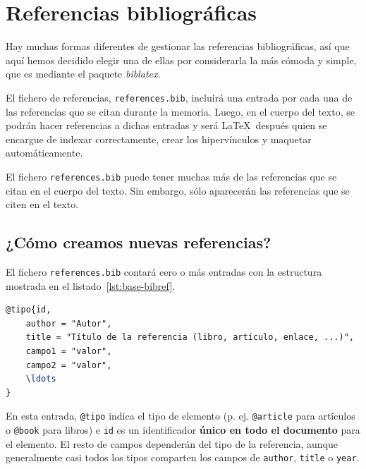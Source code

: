 \section{Referencias bibliográficas}
\label{s:referencias-bibliograficas}

Hay muchas formas diferentes de gestionar las referencias bibliográficas, así que aquí hemos decidido elegir una de ellas por considerarla la más cómoda y simple, que es mediante el paquete \textit{biblatex}.

El fichero de referencias, \texttt{references.bib}, incluirá una entrada por cada una de las referencias que se citan durante la memoria. Luego, en el cuerpo del texto, se podrán hacer referencias a dichas entradas y será \LaTeX~después quien se encargue de indexar correctamente, crear los hipervínculos y maquetar automáticamente.

El fichero \texttt{references.bib} puede tener muchas más de las referencias que se citan en el cuerpo del texto. Sin embargo, sólo aparecerán las referencias que se citen en el texto.

 
\subsection{¿Cómo creamos nuevas referencias?}

El fichero \texttt{references.bib} contará cero o más entradas con la estructura mostrada en el listado~\ref{lst:base-bibref}.

\begin{lstlisting}[language=tex,caption=Estructura general de una referencia,label=lst:base-bibref]
@tipo{id,
    author = "Autor",
    title = "Título de la referencia (libro, artículo, enlace, ...)",
    campo1 = "valor",
    campo2 = "valor",
    \ldots
}
\end{lstlisting}

En esta entrada, \texttt{@tipo} indica el tipo de elemento (p. ej. \texttt{@article} para artículos o \texttt{@book} para libros) e \texttt{id} es un identificador \textbf{único en todo el documento} para el elemento. El resto de campos dependerán del tipo de la referencia, aunque generalmente casi todos los tipos comparten los campos de \texttt{author}, \texttt{title} o \texttt{year}.

